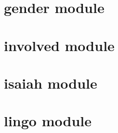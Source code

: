 \documentclass[letterpaper,10pt,english]{sphinxmanual}
\begin{document}
\section{gender module}
\label{tasks/gender::doc}\label{tasks/gender:gender-module}\label{tasks/gender:module-gender}

\begin{fulllineitems}
\label{tasks/gender:gender.task}
\end{fulllineitems}



\section{involved module}
\label{tasks/involved::doc}\label{tasks/involved:involved-module}\label{tasks/involved:module-involved}

\begin{fulllineitems}
\label{tasks/involved:involved.task}
\end{fulllineitems}



\section{isaiah module}
\label{tasks/isaiah:module-isaiah}\label{tasks/isaiah:isaiah-module}\label{tasks/isaiah::doc}

\begin{fulllineitems}
\label{tasks/isaiah:isaiah.task}
\end{fulllineitems}



\section{lingo module}
\label{tasks/lingo:lingo-module}\label{tasks/lingo:module-lingo}\label{tasks/lingo::doc}

\begin{fulllineitems}
\label{tasks/lingo:lingo.task}
\end{fulllineitems}
\end{document}
